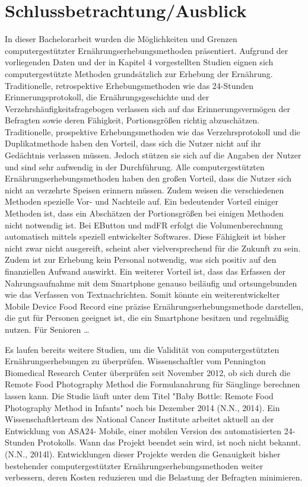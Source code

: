 \newpage
\section{Schlussbetrachtung/Ausblick}


In dieser Bachelorarbeit wurden die Möglichkeiten und Grenzen computergestützter Ernährungserhebungsmethoden präsentiert. Aufgrund der vorliegenden Daten und der in Kapitel 4 vorgestellten Studien eignen sich computergestützte Methoden grundsätzlich zur Erhebung der Ernährung. Traditionelle, retrospektive Erhebungsmethoden wie das 24-Stunden Erinnerungsprotokoll, die Ernährungsgeschichte und der Verzehrshäufigkeitsfragebogen verlassen sich auf das Erinnerungsvermögen der Befragten sowie deren Fähigkeit, Portionsgrößen richtig abzuschätzen. 
Traditionelle, prospektive Erhebungsmethoden wie das Verzehrsprotokoll und die Duplikatmethode haben den Vorteil, dass sich die Nutzer nicht auf ihr Gedächtnis verlassen müssen. Jedoch stützen sie sich auf die Angaben der Nutzer und sind sehr aufwendig in der Durchführung. 
Alle computergestützten Ernährungserhebungsmethoden haben den großen Vorteil, dass die Nutzer sich nicht an verzehrte Speisen erinnern müssen. Zudem weisen die verschiedenen Methoden spezielle Vor- und Nachteile auf. Ein bedeutender Vorteil einiger Methoden ist, dass ein Abschätzen der Portionsgrößen bei einigen Methoden nicht notwendig ist. Bei EButton und mdFR erfolgt die Volumenberechnung automatisch mittels  speziell entwickelter Softwares. Diese Fähigkeit ist bisher nicht zwar nicht ausgereift, scheint aber vielversprechend für die Zukunft zu sein. Zudem ist zur Erhebung kein Personal notwendig, was sich positiv auf den finanziellen Aufwand auswirkt. Ein weiterer Vorteil ist, dass das Erfassen der Nahrungsaufnahme mit dem Smartphone genauso beiläufig und ortsungebunden wie das Verfassen von Textnachrichten. Somit könnte ein weiterentwickelter Mobile Device Food Record eine präzise Ernährungserhebungsmethode darstellen, die gut für Personen geeignet ist, die ein Smartphone besitzen und regelmäßig nutzen. 
Für Senioren …

Es laufen bereits weitere Studien, um die Validität von computergestützten Ernährungserhebungen zu überprüfen. Wissenschaftler vom Pennington Biomedical Research Center überprüfen seit November 2012, ob sich durch die Remote Food Photography Method die Formulanahrung für Säuglinge berechnen lassen kann. Die Studie läuft unter dem Titel "Baby Bottle: Remote Food Photography Method in Infants" noch bis Dezember 2014 (N.N., 2014). Ein Wissenschaftlerteam des National Cancer Institute arbeitet aktuell an der Entwicklung von ASA24- Mobile, einer mobilen Version des automatisierten 24-Stunden Protokolls. Wann das Projekt beendet sein wird, ist noch nicht bekannt. (N.N., 2014l). Entwicklungen dieser Projekte werden die Genauigkeit bisher bestehender computergestützter Ernährungserhebungsmethoden weiter verbessern, deren Kosten reduzieren und die Belastung der Befragten minimieren.  


\newpage

